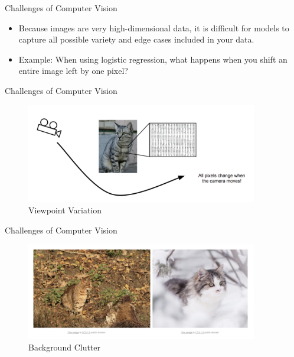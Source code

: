 \begin{frame}{Challenges of Computer Vision}
\begin{itemize}
    \item Because images are very high-dimensional data, it is difficult for models to capture all possible variety and edge cases included in your data.
    \item Example: When using logistic regression, what happens when you shift an entire image left by one pixel?
\end{itemize}
\end{frame}

\begin{frame}{Challenges of Computer Vision}
\begin{figure}
    \centering
    \includegraphics[width=0.9\textwidth]{img/viewpointvariation.png}
    \caption{Viewpoint Variation}
\end{figure}
\end{frame}

\begin{frame}{Challenges of Computer Vision}
\begin{figure}
    \centering
    \includegraphics[width=0.9\textwidth]{img/occlusion.png}
    \caption{Background Clutter}
\end{figure}
\end{frame}

